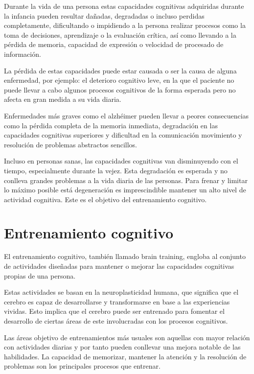 Durante la vida de una persona estas capacidades cognitivas adquiridas durante la infancia pueden resultar dañadas, degradadas o incluso perdidas completamente, dificultando o impidiendo a la persona realizar procesos como la toma de decisiones, aprendizaje o la evaluación crítica, así como llevando a la pérdida de memoria, capacidad de expresión o velocidad de procesado de información.

La pérdida de estas capacidades puede estar causada o ser la causa de alguna enfermedad, por ejemplo: el deterioro cognitivo leve, en la que el paciente no puede llevar a cabo algunos procesos cognitivos de la forma esperada pero no afecta en gran medida a su vida diaria.

Enfermedades más graves como el alzhéimer pueden llevar a peores consecuencias como la pérdida completa de la memoria inmediata, degradación en las capacidades cognitivas superiores y dificultad en la comunicación movimiento y resolución de problemas abstractos sencillos.

Incluso en personas sanas, las capacidades cognitivas van disminuyendo con el tiempo, especialmente durante la vejez. Esta degradación es esperada y no conlleva grandes problemas a la vida diaria de las personas. Para frenar y limitar lo máximo posible está degeneración es imprescindible mantener un alto nivel de actividad cognitiva. Este es el objetivo del entrenamiento cognitivo.




\section{Entrenamiento cognitivo}

El entrenamiento cognitivo, también llamado brain training, engloba al conjunto de actividades diseñadas para mantener o mejorar las capacidades cognitivas propias de una persona.

Estas actividades se basan en la neuroplasticidad humana, que significa que el cerebro es capaz de desarrollarse y transformarse en base a las experiencias vividas. Esto implica que el cerebro puede ser entrenado para fomentar el desarrollo de ciertas áreas de este involucradas con los procesos cognitivos.

Las áreas objetivo de entrenamientos más usuales son aquellas con mayor relación con actividades diarias y por tanto pueden conllevar una mejora notable de las habilidades. La capacidad de memorizar, mantener la atención y la resolución de problemas son los principales procesos que entrenar.

